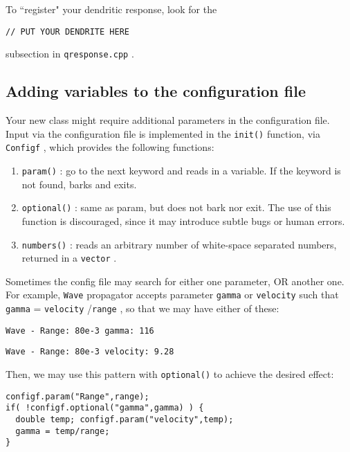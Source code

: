 \documentclass[12pt,a4paper]{article}
\newcommand{\type}[1]{{\small\small\tt #1} }
\begin{document}
To ``register" your dendritic response, look for the
\begin{lstlisting}
// PUT YOUR DENDRITE HERE
\end{lstlisting}
subsection in \type{qresponse.cpp}.

\subsection{Adding variables to the configuration file}
\label{sec:init}

Your new class might require additional parameters in the configuration file. Input via the configuration file is implemented in the \type{init()} function, via \type{Configf}, which provides the following functions:
	\begin{enumerate}
		\item \type{param()}: go to the next keyword and reads in a variable. If the keyword is not found, barks and exits.
		\item \type{optional()}: same as param, but does not bark nor exit. The use of this function is discouraged, since it may introduce subtle bugs or human errors.
		\item \type{numbers()}: reads an arbitrary number of white-space separated numbers, returned in a \type{vector}.
	\end{enumerate}

	Sometimes the config file may search for either one parameter, OR another one. For example, \type{Wave} propagator accepts parameter \type{gamma} or \type{velocity} such that \type{gamma} = \type{velocity}/\type{range}, so that we may have either of these:
\begin{lstlisting}
Wave - Range: 80e-3 gamma: 116
\end{lstlisting}

\begin{lstlisting}
Wave - Range: 80e-3 velocity: 9.28
\end{lstlisting}
	
Then, we may use this pattern with \type{optional()} to achieve the desired effect:
\begin{lstlisting}
configf.param("Range",range);
if( !configf.optional("gamma",gamma) ) {
  double temp; configf.param("velocity",temp);
  gamma = temp/range;
}
\end{lstlisting}
\end{document}
